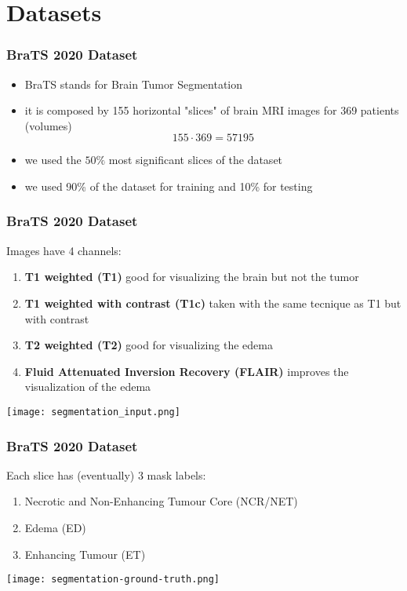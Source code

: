 \documentclass[../presentation.tex]{subfiles} %
\begin{document}
\section{Datasets} %

\begin{frame}

	\frametitle{BraTS 2020 Dataset}
    \begin{itemize}
        \item BraTS stands for Brain Tumor Segmentation
        \item it is composed by 155 horizontal "slices" of brain MRI images for 369 patients (volumes) 
        \[155 \cdot 369 = 57195 \]
        \item we used the $50\%$ most significant slices of the dataset
        \item we used 90\% of the dataset for training and 10\% for testing
    \end{itemize}

\end{frame}

\begin{frame}
    \frametitle{BraTS 2020 Dataset}
    Images have 4 channels:
        \begin{enumerate}
            \item \textbf{T1 weighted (T1)} good for visualizing the brain but not the tumor
            \item \textbf{T1 weighted with contrast (T1c)} taken with the same tecnique as T1 but with contrast
            \item \textbf{T2 weighted (T2)} good for visualizing the edema
            \item \textbf{Fluid Attenuated Inversion Recovery (FLAIR)} improves the visualization of the edema
        \end{enumerate}
        \begin{center}
            \texttt{[image: segmentation\_input.png]}
        \end{center}
\end{frame}

\begin{frame}

	\frametitle{BraTS 2020 Dataset}
    Each slice has (eventually) 3 mask labels:
    \begin{enumerate}
        \item Necrotic and Non-Enhancing Tumour Core (NCR/NET)
        \item Edema (ED)
        \item Enhancing Tumour (ET)
    \end{enumerate}
    \begin{center}
        \texttt{[image: segmentation-ground-truth.png]}
    \end{center}

\end{frame}
\end{document}
